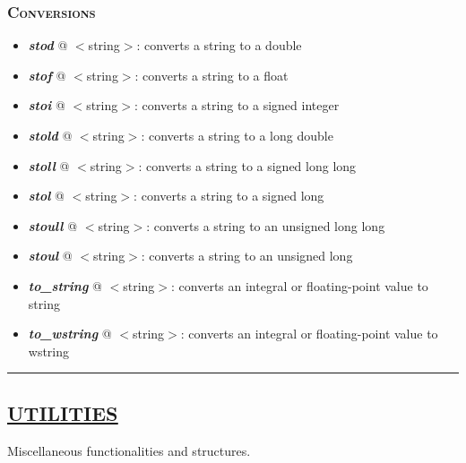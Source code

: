 \documentclass[10pt]{article}
\begin{document}
\begin{multicols*}{4}
{\subsubsection*{\textsc{Conversions}} 
\begin{itemize}[leftmargin=*,topsep=0.25pt]
  \setlength\itemsep{-1.8pt}
\item  \emph{\textbf{stod}} @ $<$string$>$: converts a string to a double
\item  \emph{\textbf{stof}} @ $<$string$>$: converts a string to a float
\item  \emph{\textbf{stoi}} @ $<$string$>$: converts a string to a signed integer
\item  \emph{\textbf{stold}} @ $<$string$>$: converts a string to a long double
\item  \emph{\textbf{stoll}} @ $<$string$>$: converts a string to a signed long long
\item  \emph{\textbf{stol}} @ $<$string$>$: converts a string to a signed long
\item  \emph{\textbf{stoull}} @ $<$string$>$: converts a string to an unsigned long long
\item  \emph{\textbf{stoul}} @ $<$string$>$: converts a string to an unsigned long
\item  \emph{\textbf{to\_string}} @ $<$string$>$: converts an integral or floating-point value to string
\item  \emph{\textbf{to\_wstring}} @ $<$string$>$: converts an integral or floating-point value to wstring
\end{itemize}

\par\noindent\rule{197pt}{0.4pt}

{\color{Blue}
\subsection*{\href{https://en.cppreference.com/w/cpp/utility}{\underline{UTILITIES}}}	
\noindent
Miscellaneous functionalities and structures.

}}
\end{multicols*}
\end{document}
